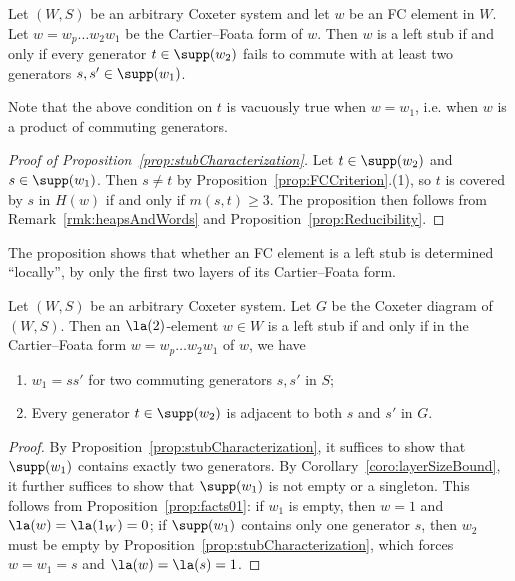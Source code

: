\begin{prop}
    \label{prop:stubCharacterization}
    Let $(W,S)$ be an arbitrary Coxeter system and let $w$ be an FC element in $W$. Let $w=w_p\dots w_2w_1$ be the
    Cartier--Foata form of $w$. Then $w$ is a left stub if and only if every generator $t\in \supp(w_2)$ fails to
    commute with at least two generators $s,s'\in \supp(w_1)$. 
\end{prop}

\begin{remark}
    Note that the above condition on $t$ is vacuously true when $w=w_1$, i.e. when $w$ is a product of commuting
    generators.
\end{remark}

\begin{proof}[Proof of Proposition~\ref{prop:stubCharacterization}]
    Let $t\in \supp(w_2)$ and $s\in \supp(w_1)$. Then $s\neq t$ by
    Proposition~\ref{prop:FCCriterion}.(1), so $t$ is covered by $s$ in $H(w)$ if and only if $m(s,t)\ge 3$.  The
    proposition then follows from Remark~\ref{rmk:heapsAndWords} and Proposition~\ref{prop:Reducibility}.
\end{proof}
\noindent 
The proposition shows that whether an FC element is a left stub is determined ``locally'', by only the first two
layers of its Cartier--Foata form. 

\begin{corollary}
    \label{coro:firstTwoLayers}
    Let $(W,S)$ be an arbitrary Coxeter system.  Let $G$ be the Coxeter diagram of $(W,S)$.  Then an
    $\la(2)$-element $w\in W$ is a left stub if and only if in the Cartier--Foata form $w=w_p\dots w_2w_1$ of $w$,
    we have 
    \begin{enumerate} 
        \item  $w_1=ss'$ for two commuting generators $s, s'$ in $S$;
        \item Every generator $t\in \supp(w_2)$ is adjacent to both $s$ and $s'$ in $G$.  
    \end{enumerate}
\end{corollary}

\begin{proof}
    By Proposition~\ref{prop:stubCharacterization}, it suffices to show that $\supp(w_1)$ contains exactly two
    generators.  By Corollary~\ref{coro:layerSizeBound}, it further suffices to show that
    $\supp(w_1)$ is not empty or a singleton.  This follows from Proposition~\ref{prop:facts01}: if $w_1$ is
    empty, then $w=1$ and $\la(w)=\la(1_W)=0$; if $\supp(w_1)$ contains only one generator $s$, then
    $w_2$ must be empty by Proposition~\ref{prop:stubCharacterization}, which forces $w=w_1=s$ and
    $\la(w)=\la(s)=1$.    
\end{proof}

